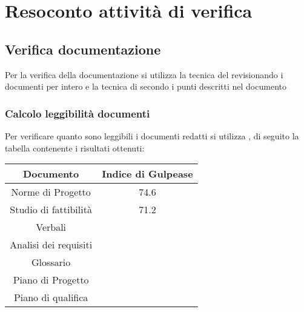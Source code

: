 \section{Resoconto attività di verifica}

\subsection{Verifica documentazione}
Per la verifica della documentazione si utilizza la tecnica del  revisionando i documenti per intero e la tecnica di  secondo i punti descritti nel documento 

\subsubsection{Calcolo leggibilità documenti}
Per verificare quanto sono leggibili i documenti redatti si utilizza , di seguito la tabella contenente i risultati ottenuti:

\begin{center}
	\begin{longtable}{|c|c|}
	\hline
	\rowcolor{lighter-grayer}
	\textbf{Documento} & \textbf{Indice di Gulpease} \\
	\hline
	\endfirsthead

	\hline
	Norme di Progetto &  74.6 \\
	\hline
	\hline
	Studio di fattibilità & 71.2 \\
	\hline
	\hline
	Verbali &  \\
	\hline
	\hline
	Analisi dei requisiti &  \\
	\hline
	\hline
	Glossario &  \\
	\hline
	\hline
	Piano di Progetto &  \\
	\hline
	\hline
	Piano di qualifica &  \\
	\hline

	\end{longtable}
\end{center}